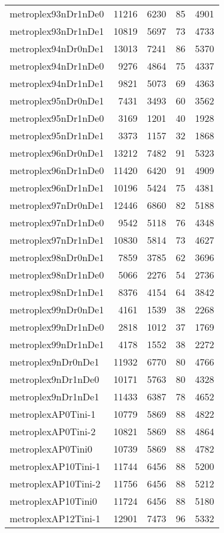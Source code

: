 \begin{longtable}{lrrrr}
metroplex93nDr1nDe0 & 11216 & 6230 & 85 & 4901 \\
metroplex93nDr1nDe1 & 10819 & 5697 & 73 & 4733 \\
metroplex94nDr0nDe1 & 13013 & 7241 & 86 & 5370 \\
metroplex94nDr1nDe0 & 9276 & 4864 & 75 & 4337 \\
metroplex94nDr1nDe1 & 9821 & 5073 & 69 & 4363 \\
metroplex95nDr0nDe1 & 7431 & 3493 & 60 & 3562 \\
metroplex95nDr1nDe0 & 3169 & 1201 & 40 & 1928 \\
metroplex95nDr1nDe1 & 3373 & 1157 & 32 & 1868 \\
metroplex96nDr0nDe1 & 13212 & 7482 & 91 & 5323 \\
metroplex96nDr1nDe0 & 11420 & 6420 & 91 & 4909 \\
metroplex96nDr1nDe1 & 10196 & 5424 & 75 & 4381 \\
metroplex97nDr0nDe1 & 12446 & 6860 & 82 & 5188 \\
metroplex97nDr1nDe0 & 9542 & 5118 & 76 & 4348 \\
metroplex97nDr1nDe1 & 10830 & 5814 & 73 & 4627 \\
metroplex98nDr0nDe1 & 7859 & 3785 & 62 & 3696 \\
metroplex98nDr1nDe0 & 5066 & 2276 & 54 & 2736 \\
metroplex98nDr1nDe1 & 8376 & 4154 & 64 & 3842 \\
metroplex99nDr0nDe1 & 4161 & 1539 & 38 & 2268 \\
metroplex99nDr1nDe0 & 2818 & 1012 & 37 & 1769 \\
metroplex99nDr1nDe1 & 4178 & 1552 & 38 & 2272 \\
metroplex9nDr0nDe1 & 11932 & 6770 & 80 & 4766 \\
metroplex9nDr1nDe0 & 10171 & 5763 & 80 & 4328 \\
metroplex9nDr1nDe1 & 11433 & 6387 & 78 & 4652 \\
metroplexAP0Tini-1 & 10779 & 5869 & 88 & 4822 \\
metroplexAP0Tini-2 & 10821 & 5869 & 88 & 4864 \\
metroplexAP0Tini0 & 10739 & 5869 & 88 & 4782 \\
metroplexAP10Tini-1 & 11744 & 6456 & 88 & 5200 \\
metroplexAP10Tini-2 & 11756 & 6456 & 88 & 5212 \\
metroplexAP10Tini0 & 11724 & 6456 & 88 & 5180 \\
metroplexAP12Tini-1 & 12901 & 7473 & 96 & 5332 \\

\end{longtable}
